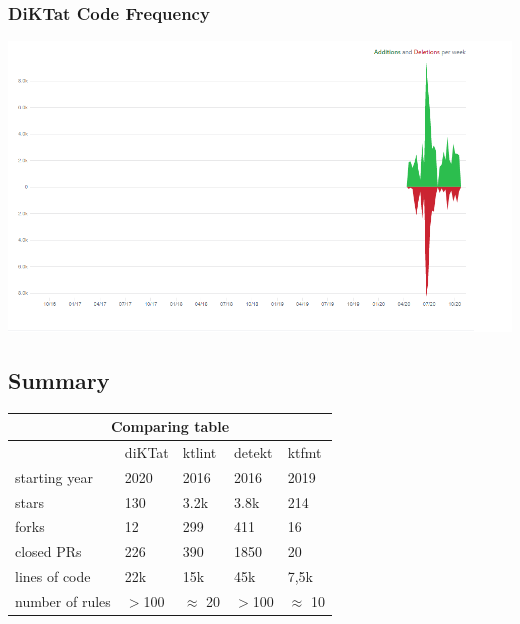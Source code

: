 \subsubsection{DiKTat Code Frequency}
\includegraphics[scale=0.6]{pictures/diktat.png}
\subsection{Summary}

\begin{center}
\begin{tabular}{ |p{3cm}|p{3cm}|p{3cm}|p{3cm}|p{3cm}|  }
\hline
\multicolumn{5}{|c|}{\textbf{Comparing table}} \\
\hline
& diKTat& ktlint &detekt & ktfmt \\
\hline
starting year & 2020 & 2016 & 2016 & 2019 \\
stars & 130 & 3.2k & 3.8k & 214\\ 
forks & 12 & 299 & 411 & 16\\
closed PRs & 226 & 390 & 1850 & 20 \\
lines of code & 22k & 15k & 45k & 7,5k\\
number of rules & $>$100 & $\approx$ 20 & $>$100 & $\approx$ 10 \\
\hline

\hline
\end{tabular}
\end{center}